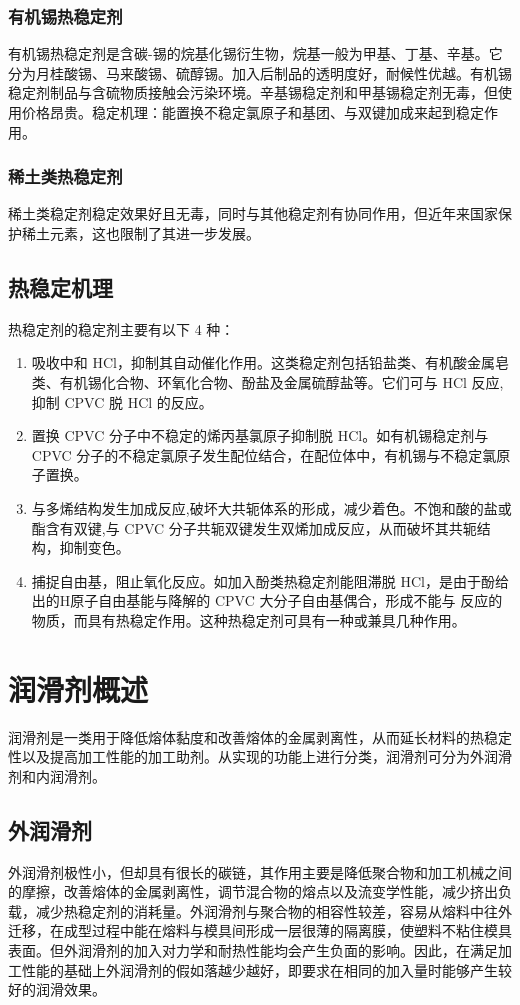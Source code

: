 \documentclass[a4paper, oneside, onecolumn, 12pt]{ctexrep}    %
\begin{document}
\subsubsection{有机锡热稳定剂}
有机锡热稳定剂是含碳-锡的烷基化锡衍生物，烷基一般为甲基、丁基、辛基。它分为月桂酸锡、马来酸锡、硫醇锡。加入后制品的透明度好，耐候性优越。有机锡稳定剂制品与含硫物质接触会污染环境。辛基锡稳定剂和甲基锡稳定剂无毒，但使用价格昂贵。稳定机理：能置换不稳定氯原子和基团、与双键加成来起到稳定作用。

\subsubsection{稀土类热稳定剂}
稀土类稳定剂稳定效果好且无毒，同时与其他稳定剂有协同作用，但近年来国家保护稀土元素，这也限制了其进一步发展。


\subsection{热稳定机理}

热稳定剂的稳定剂主要有以下 4 种：
\begin{enumerate}[(1) ]
    \item 吸收中和 HCl，抑制其自动催化作用。这类稳定剂包括铅盐类、有机酸金属皂类、有机锡化合物、环氧化合物、酚盐及金属硫醇盐等。它们可与 HCl 反应,抑制 CPVC 脱 HCl 的反应。
    \item 置换 CPVC 分子中不稳定的烯丙基氯原子抑制脱 HCl。如有机锡稳定剂与 CPVC 分子的不稳定氯原子发生配位结合，在配位体中，有机锡与不稳定氯原子置换。
    \item 与多烯结构发生加成反应,破坏大共轭体系的形成，减少着色。不饱和酸的盐或酯含有双键,与 CPVC 分子共轭双键发生双烯加成反应，从而破坏其共轭结构，抑制变色。
    \item 捕捉自由基，阻止氧化反应。如加入酚类热稳定剂能阻滞脱 HCl，是由于酚给出的H原子自由基能与降解的 CPVC 大分子自由基偶合，形成不能与  反应的物质，而具有热稳定作用。这种热稳定剂可具有一种或兼具几种作用。
\end{enumerate}

\section{润滑剂概述\cite{2}}
润滑剂是一类用于降低熔体黏度和改善熔体的金属剥离性，从而延长材料的热稳定性以及提高加工性能的加工助剂。从实现的功能上进行分类，润滑剂可分为外润滑剂和内润滑剂。

\subsection{外润滑剂}
外润滑剂极性小，但却具有很长的碳链，其作用主要是降低聚合物和加工机械之间的摩擦，改善熔体的金属剥离性，调节混合物的熔点以及流变学性能，减少挤出负载，减少热稳定剂的消耗量。外润滑剂与聚合物的相容性较差，容易从熔料中往外迁移，在成型过程中能在熔料与模具间形成一层很薄的隔离膜，使塑料不粘住模具表面。但外润滑剂的加入对力学和耐热性能均会产生负面的影响。因此，在满足加工性能的基础上外润滑剂的假如落越少越好，即要求在相同的加入量时能够产生较好的润滑效果。
\end{document}
